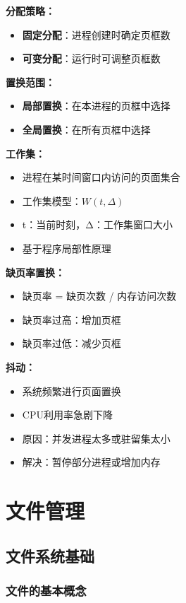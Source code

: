 \documentclass[lang=cn,newtx,10pt,scheme=chinese]{../../elegantbook}
\begin{document}
\textbf{分配策略：}
\begin{itemize}
  \item \textbf{固定分配}：进程创建时确定页框数
  \item \textbf{可变分配}：运行时可调整页框数
\end{itemize}

\textbf{置换范围：}
\begin{itemize}
  \item \textbf{局部置换}：在本进程的页框中选择
  \item \textbf{全局置换}：在所有页框中选择
\end{itemize}

\textbf{工作集：}
\begin{itemize}
  \item 进程在某时间窗口内访问的页面集合
  \item 工作集模型：$W(t,Δ)$
  \item t：当前时刻，Δ：工作集窗口大小
  \item 基于程序局部性原理
\end{itemize}

\textbf{缺页率置换：}
\begin{itemize}
  \item 缺页率 = 缺页次数 / 内存访问次数
  \item 缺页率过高：增加页框
  \item 缺页率过低：减少页框
\end{itemize}

\textbf{抖动：}
\begin{itemize}
  \item 系统频繁进行页面置换
  \item CPU利用率急剧下降
  \item 原因：并发进程太多或驻留集太小
  \item 解决：暂停部分进程或增加内存
\end{itemize}

\chapter{文件管理}

\section{文件系统基础}

\subsection{文件的基本概念}
\end{document}
